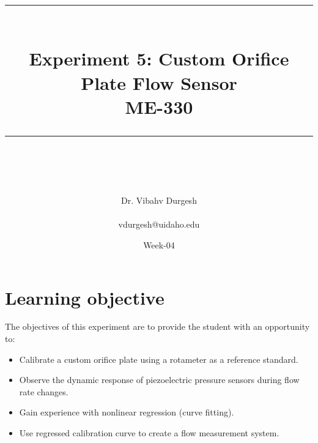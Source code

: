 \documentclass{article} %
\newcommand{\HRule}{\rule{\linewidth}{0.5mm}} %
\begin{document}


\title{
\begin{center}
\HRule \\[0.4cm]
{\Huge \bfseries Experiment 5:  Custom Orifice Plate Flow Sensor \\[0.5cm] \Large ME-330}\\[0.4cm] %
\HRule \\[1.5cm]
\end{center}
}
\author{\Huge Dr. Vibahv Durgesh \\ \\ \LARGE vdurgesh@uidaho.edu \\[2cm]} %
\date{Week-04} %
\maketitle

\tableofcontents

\clearpage



\section{Learning objective}
The objectives of this experiment are to provide the student with an opportunity to:

\begin{itemize}
\item	Calibrate a custom orifice plate using a rotameter as a reference standard.
\item	Observe the dynamic response of piezoelectric pressure sensors during flow rate changes.
\item	Gain experience with nonlinear regression (curve fitting).
\item	Use regressed calibration curve to create a flow measurement system.
\end{itemize}
\end{document}
